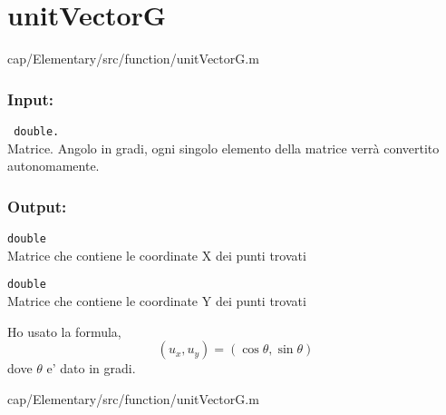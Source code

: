 \section{unitVectorG}\label{fnc:unitVectorG}


{cap/Elementary/src/function/unitVectorG.m}%

\subsubsection{Input:}
\begin{tcolorbox}
    \begin{description} 
        \setlength{\itemindent}{-.2in}%
        
        \item[\textit{angleG:}] \verb| double.|\\
        Matrice. Angolo in gradi, ogni singolo elemento della matrice verrà 
        convertito autonomamente.
    \end{description}
\end{tcolorbox}

\subsubsection{Output:}
\begin{tcolorbox}
    \begin{description}
        \setlength{\itemindent}{-.2in}
        
        \item[\textit{x:}] \verb|double| \\
        Matrice che contiene le coordinate X dei punti trovati
        
        \item[\textit{y:}] \verb|double| \\
        Matrice che contiene le coordinate Y dei punti trovati
    \end{description}
\end{tcolorbox}

Ho usato la formula, $$(u_x , u_y)=(\cos\theta,\sin\theta)$$ 
dove $\theta$ e' dato in gradi.

{cap/Elementary/src/function/unitVectorG.m}%


